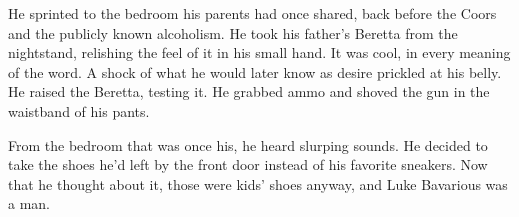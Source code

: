 He sprinted to the bedroom his parents had once shared, back before
the Coors and the publicly known alcoholism. He took his
father's Beretta from the nightstand, relishing the feel of
it in his small hand. It was cool, in every meaning of the word. A
shock of what he would later know as desire prickled at his belly.
He raised the Beretta, testing it. He grabbed ammo and shoved the
gun in the waistband of his pants.



From the bedroom that was once his, he heard slurping sounds. He
decided to take the shoes he'd left by the front door instead
of his favorite sneakers. Now that he thought about it, those were
kids' shoes anyway, and Luke Bavarious was a man.







